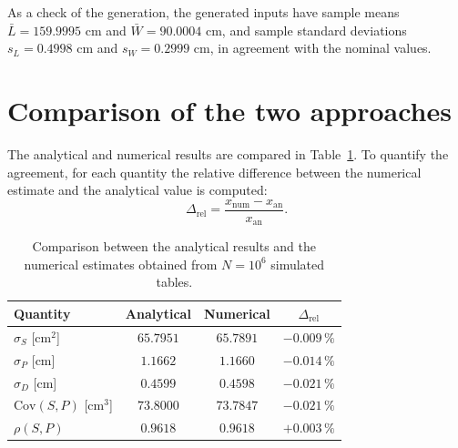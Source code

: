 \documentclass[11pt,a4paper]{article}
\begin{document}
	As a check of the generation, the generated inputs have sample means $\bar{L} = 159.9995$ cm and $\bar{W} = 90.0004$ cm, and sample standard deviations $s_L = 0.4998$ cm and $s_W = 0.2999$ cm, in agreement with the nominal values.
	
	\section*{Comparison of the two approaches}
	
	The analytical and numerical results are compared in Table~\ref{tab:comparison}.
	To quantify the agreement, for each quantity the relative difference between the numerical estimate and the analytical value is computed:
	\begin{equation}
		\Delta_{\text{rel}} = \frac{x_{\text{num}} - x_{\text{an}}}{x_{\text{an}}} .
	\end{equation}
	
	\begin{table}[!h]
		\centering
		\begin{tabular}{l c c c}
			\hline
			Quantity & Analytical & Numerical & $\Delta_{\text{rel}}$ \\
			\hline
			$\sigma_S$ [cm$^2$]       & $65.7951$ & $65.7891$ & $-0.009\,\%$ \\
			$\sigma_P$ [cm]           & $1.1662$  & $1.1660$  & $-0.014\,\%$ \\
			$\sigma_D$ [cm]           & $0.4599$  & $0.4598$  & $-0.021\,\%$ \\
			$\mathrm{Cov}(S, P)$ [cm$^3$] & $73.8000$ & $73.7847$ & $-0.021\,\%$ \\
			$\rho(S, P)$              & $0.9618$  & $0.9618$  & $+0.003\,\%$ \\
			\hline
		\end{tabular}
		\caption{Comparison between the analytical results and the numerical estimates obtained from $N = 10^6$ simulated tables.}
		\label{tab:comparison}
	\end{table}
	\FloatBarrier
	
\end{document}
